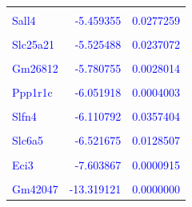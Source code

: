 \documentclass[
  letterpaper,
  DIV=11,
  numbers=noendperiod]{scrartcl}
\begin{document}
\begin{table}
\begin{tabular}[t]{lrr}
\textcolor{blue}{\cellcolor{gray!6}{Gm28703}} & \textcolor{blue}{\cellcolor{gray!6}{-5.407426}} & \textcolor{blue}{\cellcolor{gray!6}{0.0295832}}\\
\addlinespace
\textcolor{blue}{Sall4} & \textcolor{blue}{-5.459355} & \textcolor{blue}{0.0277259}\\
\textcolor{blue}{\cellcolor{gray!6}{Tex38}} & \textcolor{blue}{\cellcolor{gray!6}{-5.520092}} & \textcolor{blue}{\cellcolor{gray!6}{0.0277259}}\\
\textcolor{blue}{Slc25a21} & \textcolor{blue}{-5.525488} & \textcolor{blue}{0.0237072}\\
\textcolor{blue}{\cellcolor{gray!6}{Mobp}} & \textcolor{blue}{\cellcolor{gray!6}{-5.739904}} & \textcolor{blue}{\cellcolor{gray!6}{0.0195807}}\\
\textcolor{blue}{Gm26812} & \textcolor{blue}{-5.780755} & \textcolor{blue}{0.0028014}\\
\addlinespace
\textcolor{blue}{\cellcolor{gray!6}{Cyb5r2}} & \textcolor{blue}{\cellcolor{gray!6}{-5.964004}} & \textcolor{blue}{\cellcolor{gray!6}{0.0149785}}\\
\textcolor{blue}{Ppp1r1c} & \textcolor{blue}{-6.051918} & \textcolor{blue}{0.0004003}\\
\textcolor{blue}{\cellcolor{gray!6}{Lrrc39}} & \textcolor{blue}{\cellcolor{gray!6}{-6.057120}} & \textcolor{blue}{\cellcolor{gray!6}{0.0496973}}\\
\textcolor{blue}{Slfn4} & \textcolor{blue}{-6.110792} & \textcolor{blue}{0.0357404}\\
\textcolor{blue}{\cellcolor{gray!6}{Adgb}} & \textcolor{blue}{\cellcolor{gray!6}{-6.342525}} & \textcolor{blue}{\cellcolor{gray!6}{0.0100377}}\\
\addlinespace
\textcolor{blue}{Slc6a5} & \textcolor{blue}{-6.521675} & \textcolor{blue}{0.0128507}\\
\textcolor{blue}{\cellcolor{gray!6}{2610028E06Rik}} & \textcolor{blue}{\cellcolor{gray!6}{-6.722017}} & \textcolor{blue}{\cellcolor{gray!6}{0.0006642}}\\
\textcolor{blue}{Eci3} & \textcolor{blue}{-7.603867} & \textcolor{blue}{0.0000915}\\
\textcolor{blue}{\cellcolor{gray!6}{Xist}} & \textcolor{blue}{\cellcolor{gray!6}{-11.984433}} & \textcolor{blue}{\cellcolor{gray!6}{0.0000468}}\\
\textcolor{blue}{Gm42047} & \textcolor{blue}{-13.319121} & \textcolor{blue}{0.0000000}\\
\bottomrule
\end{tabular}
\endgroup{}
\end{table}
\end{document}
